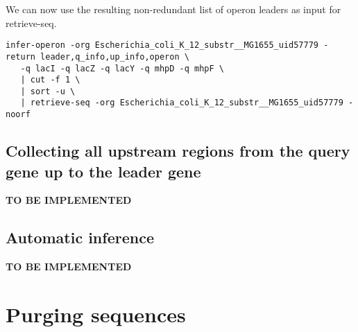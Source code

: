 We can now use the resulting non-redundant list of operon leaders as
input for retrieve-seq.

\begin{lstlisting}
infer-operon -org Escherichia_coli_K_12_substr__MG1655_uid57779 -return leader,q_info,up_info,operon \
   -q lacI -q lacZ -q lacY -q mhpD -q mhpF \
   | cut -f 1 \
   | sort -u \
   | retrieve-seq -org Escherichia_coli_K_12_substr__MG1655_uid57779 -noorf
\end{lstlisting}


\subsection{Collecting all upstream regions from the query gene up to
  the leader gene}

\textbf{TO BE IMPLEMENTED}

\subsection{Automatic inference}

\textbf{TO BE IMPLEMENTED}


\section{Purging sequences}

\tbw
